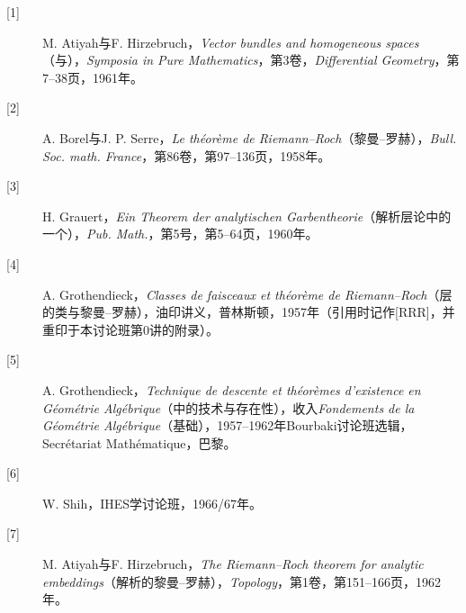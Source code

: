 \begin{description}
\item[{[1]}] M. Atiyah与F. Hirzebruch，\textit{Vector bundles and homogeneous spaces}（与），\textit{Symposia in Pure Mathematics}，第3卷，\textit{Differential Geometry}，第7--38页，1961年。
\item[{[2]}] A. Borel与J. P. Serre，\textit{Le théorème de Riemann--Roch}（黎曼--罗赫），\textit{Bull. Soc. math. France}，第86卷，第97--136页，1958年。
\item[{[3]}] H. Grauert，\textit{Ein Theorem der analytischen Garbentheorie}（解析层论中的一个），\textit{Pub. Math.}，第5号，第5--64页，1960年。
\item[{[4]}] A. Grothendieck，\textit{Classes de faisceaux et théorème de Riemann--Roch}（层的类与黎曼--罗赫），油印讲义，普林斯顿，1957年（引用时记作[RRR]，并重印于本讨论班第0讲的附录）。
\item[{[5]}] A. Grothendieck，\textit{Technique de descente et théorèmes d'existence en Géométrie Algébrique}（中的技术与存在性），收入\textit{Fondements de la Géométrie Algébrique}（基础），1957--1962年Bourbaki讨论班选辑，Secrétariat Mathématique，巴黎。
\item[{[6]}] W. Shih，IHES学讨论班，1966/67年。
\item[{[7]}] M. Atiyah与F. Hirzebruch，\textit{The Riemann--Roch theorem for analytic embeddings}（解析的黎曼--罗赫），\textit{Topology}，第1卷，第151--166页，1962年。
\end{description}
